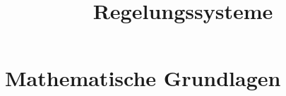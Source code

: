 \documentclass[german]{latex4ei/latex4ei_sheet}
\title{Regelungssysteme}
\begin{document}
\maketitle






\section{Mathematische Grundlagen}
\end{document}
